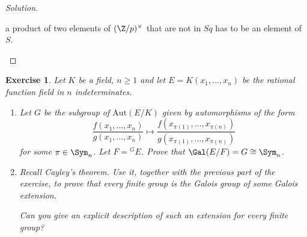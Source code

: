 \documentclass[a4paper,10pt,reqno]{amsart}
\newtheorem{ex}{Exercise}[section]
\newenvironment{sol}
  {\renewcommand\qedsymbol{$\blacksquare$}\begin{proof}[Solution]}
  {\end{proof}}
\begin{document}
\begin{sol}
\begin{enumerate}[label=(\roman*)]
 a product of two elements of $(\Z/p)^{\times}$
 that are not in $Sq$ has to be an element of $S$.\qedhere
 \end{enumerate}
\end{sol}


\begin{ex}
\label{10.2}
Let $K$ be a field, $n \geq 1$ and let $E = K(x_1,\ldots,x_n)$ be the rational function field in $n$ indeterminates.
    \begin{enumerate}[label=(\roman*)]
        \item Let $G$ be the subgroup of $\mathrm{Aut}(E/K)$ given by automorphisms of the form
        \[
        \frac{f(x_1,\ldots,x_n)}{g(x_1,\ldots,x_n)} \mapsto \frac{f(x_{\pi(1)},\ldots,x_{\pi(n)})}{g(x_{\pi(1)},\ldots,x_{\pi(n)})}
        \]
        for some $\pi \in \Sym_n$. Let $F = {}^GE$. Prove that $\Gal(E/F)=G \cong \Sym_n$.

        \item Recall Cayley's theorem. Use it, together with the previous part of the exercise, to prove that every finite group is the Galois group of some Galois extension.

        Can you give an explicit description of such an extension for every finite group?
    \end{enumerate}
\end{ex}
\end{document}
